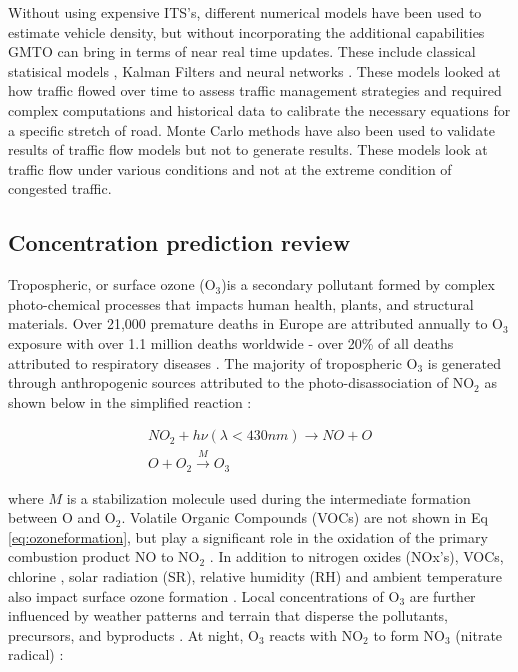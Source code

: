 Without using expensive ITS's, different numerical models have been used to estimate vehicle density, but without incorporating the additional capabilities GMTO can bring in terms of near real time updates. These include classical statisical models \citep{Schreckenberg1995}, Kalman Filters \citep{Pourmoallem1997, Sun2004} and neural networks \citep{Ghosh-Dastidar2006}.  These models looked at how traffic flowed over time to assess traffic management strategies and required complex computations and historical data to calibrate the necessary equations for a specific stretch of road.  Monte Carlo methods have also been used to validate results of traffic flow models \citep{Mihaylova2004} but not to generate results.  These models look at traffic flow under various conditions and not at the extreme condition of congested traffic.  

\subsection{Concentration prediction review}

Tropospheric, or surface ozone (O$_{3}$)is a secondary pollutant formed by complex photo-chemical processes that impacts human health, plants, and structural materials. Over 21,000 premature deaths in Europe are attributed annually to O$_{3}$ exposure \citep{WHO2008} with over 1.1 million deaths worldwide - over 20\% of all deaths attributed to respiratory diseases \citep{Malley2017}. The majority of tropospheric O$_{3}$ is generated through anthropogenic sources \citep{Lelieveld2000, Cooper2006} attributed to the photo-disassociation of NO$_{2}$ as shown below in the simplified reaction \citep{Finlayson1993}:

\begin{equation}
\label{eq:ozoneformation}
\begin{gathered}
NO_{2}+h\nu (\lambda < 430nm) \rightarrow NO+O \\
O+O_{2}\overset{M}{\rightarrow} O_{3}
\end{gathered}
\end{equation}

\noindent
where $M$ is a stabilization molecule used during the intermediate formation between O and O$_{2}$. Volatile Organic Compounds (VOCs) are not shown in Eq \ref{eq:ozoneformation}, but play a significant role in the oxidation of the primary combustion product NO to NO$_{2}$ \citep{Song2011}. In addition to nitrogen oxides (NOx's), VOCs, chlorine \citep{Thornton2010}, solar radiation (SR), relative humidity (RH) and ambient temperature also impact surface ozone formation \citep{Sadanaga2003}.  Local concentrations of O$_{3}$ are further influenced by weather patterns and terrain that disperse the pollutants, precursors, and byproducts \citep{Beck1998}. At night, O$_{3}$ reacts with NO$_{2}$ to form NO$_{3}$ (nitrate radical) \citep{Finlayson1993}:

